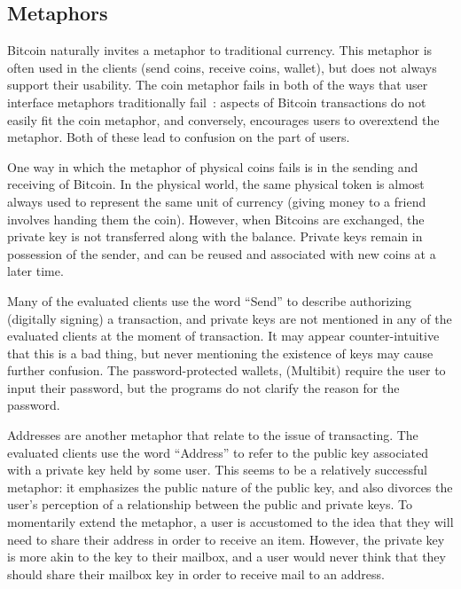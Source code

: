 



\subsection{Metaphors}

Bitcoin naturally invites a metaphor to traditional currency. This metaphor is often used in the clients (\eg send coins, receive coins, wallet), but does not always support their usability. The coin metaphor fails in both of the ways that user interface metaphors traditionally fail~\cite{metaphorpaper}: aspects of Bitcoin transactions do not easily fit the coin metaphor, and conversely, encourages users to overextend the metaphor. Both of these lead to confusion on the part of users.   

One way in which the metaphor of physical coins fails is in the sending and receiving of Bitcoin. In the physical world, the same physical token is almost always used to represent the same unit of currency (\ie giving money to a friend involves handing them the coin). However, when Bitcoins are exchanged, the private key is not transferred along with the balance. Private keys remain in possession of the sender, and can be reused and associated with new coins at a later time. 

Many of the evaluated clients use the word ``Send'' to describe authorizing (digitally signing) a transaction, and private keys are not mentioned in any of the evaluated clients at the moment of transaction. It may appear counter-intuitive that this is a bad thing, but never mentioning the existence of keys may cause further confusion. The password-protected wallets, (\eg Multibit) require the user to input their password, but the programs do not clarify the reason for the password.

Addresses are another metaphor that relate to the issue of transacting. The evaluated clients use the word ``Address'' to refer to the public key associated with a private key held by some user. This seems to be a relatively successful metaphor: it emphasizes the public nature of the public key, and also divorces the user's perception of a relationship between the public and private keys. To momentarily extend the metaphor, a user is accustomed to the idea that they will need to share their address in order to receive an item. However, the private key is more akin to the key to their mailbox, and a user would never think that they should share their mailbox key in order to receive mail to an address. 

